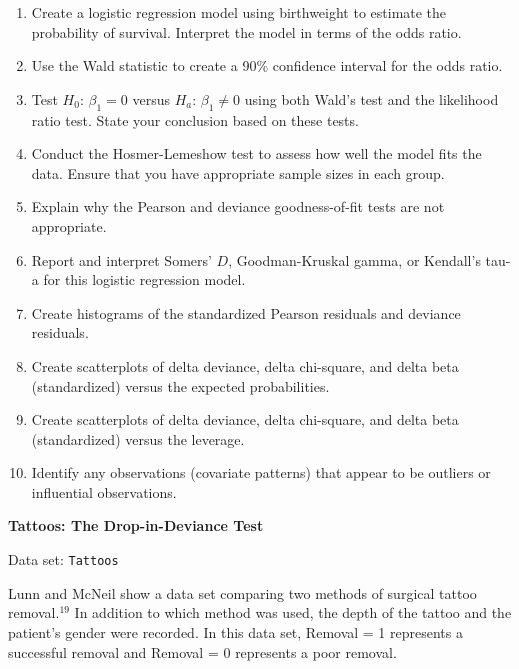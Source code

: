 \documentclass[
]{report}
\begin{document}
\begin{list}{E..}{ \setlength{\itemsep}{1.2em}}
  \begin{enumerate}
    \item Create a logistic regression model using birthweight to estimate the probability of survival. Interpret the model in terms of the odds ratio.
    \item Use the Wald statistic to create a 90\% confidence interval for the odds ratio.
    \item Test $H_0$: $\beta_1 = 0$ versus $H_a$: $\beta_1 \ne 0$ using both Wald’s test and the likelihood ratio test. State your conclusion based on these tests.
    \item Conduct the Hosmer-Lemeshow test to assess how well the model fits the data. Ensure that you have appropriate sample sizes in each group.
    \item Explain why the Pearson and deviance goodness-of-fit tests are not appropriate.
    \item Report and interpret Somers’ $D$, Goodman-Kruskal gamma, or Kendall’s tau-a for this logistic regression model.
    \item Create histograms of the standardized Pearson residuals and deviance residuals.
    \item Create scatterplots of delta deviance, delta chi-square, and delta beta (standardized) versus the expected probabilities.
    \item Create scatterplots of delta deviance, delta chi-square, and delta beta (standardized) versus the leverage.
    \item Identify any observations (covariate patterns) that appear to be outliers or influential observations.
  \end{enumerate}

  \item \textbf{Tattoos: The Drop-in-Deviance Test}

Data set: \texttt{Tattoos}

Lunn and McNeil show a data set comparing two methods of surgical tattoo removal.$^{19}$ In addition to which method was used, the depth of the tattoo and the patient’s gender were recorded. In this data set, Removal = 1 represents a successful removal and Removal = 0 represents a poor removal.


\end{list}
\end{document}
